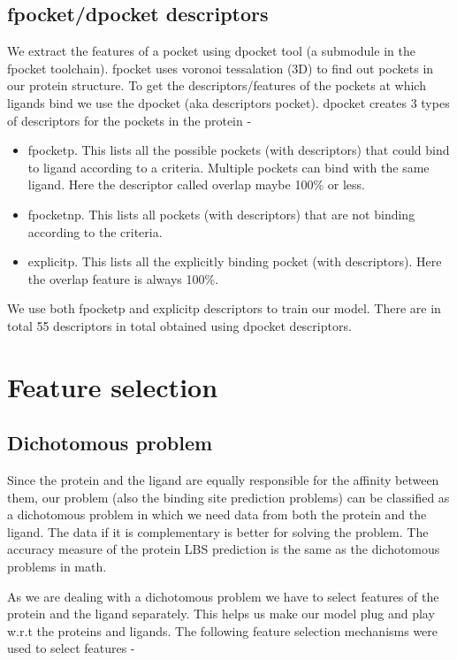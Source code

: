 \documentclass[11pt]{article}
\begin{document}
\subsection{fpocket/dpocket descriptors}
We extract the features of a pocket using dpocket tool (a submodule in the fpocket toolchain).
fpocket uses voronoi tessalation (3D) to find out pockets in our protein structure.
To get the descriptors/features of the pockets at which ligands bind we use the dpocket (aka descriptors pocket).
dpocket creates 3 types of descriptors for the pockets in the protein -
\begin{itemize}
\item fpocketp.  This lists all the possible pockets (with descriptors) that could bind to ligand according to a criteria.
Multiple pockets can bind with the same ligand.
Here the descriptor called overlap maybe 100\% or less.
\item fpocketnp.  This lists all pockets (with descriptors) that are not binding according to the criteria.
\item explicitp.
This lists all the explicitly binding pocket (with descriptors).
Here the overlap feature is always 100\%.
\end{itemize}

We use both fpocketp and explicitp descriptors to train our model.
There are in total 55 descriptors in total obtained using dpocket descriptors.



\section{Feature selection}

\subsection{Dichotomous problem}
Since the protein and the ligand are equally responsible for the affinity between them, our problem (also the binding site prediction problems) can be classified as a dichotomous problem in which we need data from both
the protein and the ligand.
The data if it is complementary is better for solving the problem.
The accuracy measure of the protein LBS prediction is the same as the dichotomous problems in math.

As we are dealing with a dichotomous problem we have to select features of the protein and the ligand separately.
This helps us make our model plug and play w.r.t the proteins and ligands.
The following feature selection mechanisms were used to select features -
\end{document}
